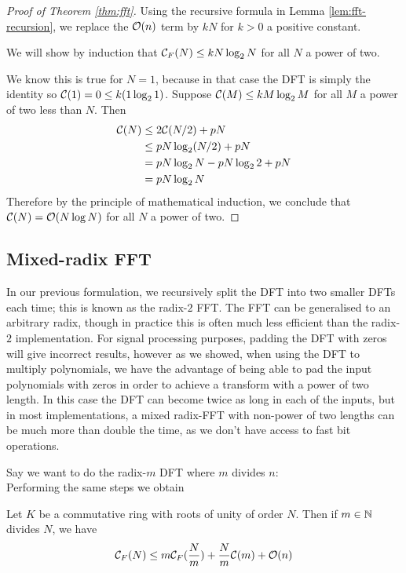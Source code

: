 \begin{proof}[Proof of Theorem \ref{thm:fft}]
    Using the recursive formula in Lemma \ref{lem:fft-recursion}, we replace the $\mathcal O(n)$ term by $kN$ for $k> 0$ a positive constant.

    We will show by induction that $\mathcal C_F(N) \le kN\log_2 N$ for all $N$ a power of two.

    We know this is true for $N = 1$, because in that case the DFT is simply the identity so $\mathcal C(1) = 0 \le k(1 \log_2 1)$.
    Suppose $\mathcal C(M) \le kM\log_2 M$ for all $M$ a power of two less than $N$. Then
    \begin{align*}
        \mathcal C(N)
        &\le 2\mathcal C(N/2) + pN\\
        &\le pN\log_2 (N/2) + pN\\
        &= pN\log_2 N - pN\log_2 2 + pN\\
        &= pN\log_2 N
    \end{align*}
    Therefore by the principle of mathematical induction, we conclude that $\mathcal C(N) = \mathcal O(N \log N)$ for all $N$ a power of two.
\end{proof}


\subsection{Mixed-radix FFT}

In our previous formulation, we recursively split the DFT into two smaller DFTs each time; this is known as the radix-$2$ FFT. The FFT can be generalised to an arbitrary radix, though in practice this is often much less efficient than the radix-$2$ implementation. For signal processing purposes, padding the DFT with zeros will give incorrect results, however as we showed, when using the DFT to multiply polynomials, we have the advantage of being able to pad the input polynomials with zeros in order to achieve a transform with a power of two length. In this case the DFT can become twice as long in each of the inputs, but in most implementations, a mixed radix-FFT with non-power of two lengths can be much more than double the time, as we don't have access to fast bit operations.

Say we want to do the radix-$m$ DFT where $m$ divides $n$:\\
Performing the same steps we obtain

\begin{theorem}\label{thm:mixed-radix-fft}
    Let $K$ be a commutative ring with roots of unity of order $N$. Then if $m \in {\mathbb N}$ divides $N$, we have
    \[
        \mathcal C_F(N) \le m\mathcal C_F(\frac{N}{m}) + \frac{N}{m}\mathcal C(m) + \mathcal O(n)
    \]
\end{theorem}

